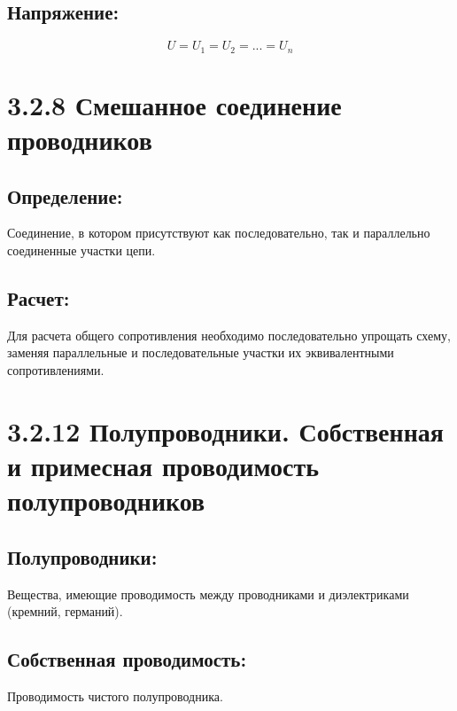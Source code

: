 \documentclass[a4paper,12pt]{article}
\begin{document}
\vspace{-9pt}
\subsection*{Напряжение:}
\vspace{-3pt}
\vspace{-0.05em}
$$ U = U_1 = U_2 = ... = U_n $$

\section*{3.2.8 Смешанное соединение проводников}
\vspace{-9pt}
\subsection*{Определение:}
\vspace{-3pt}
Соединение, в котором присутствуют как последовательно, так и параллельно соединенные участки цепи.

\vspace{-9pt}
\subsection*{Расчет:}
\vspace{-3pt}
Для расчета общего сопротивления необходимо последовательно упрощать схему, заменяя параллельные и последовательные участки их эквивалентными сопротивлениями.

\newpage
\section*{3.2.12 Полупроводники. Собственная и примесная проводимость полупроводников}
\vspace{-9pt}
\subsection*{Полупроводники:}
\vspace{-3pt}
Вещества, имеющие проводимость между проводниками и диэлектриками (кремний, германий).

\vspace{-9pt}
\subsection*{Собственная проводимость:}
\vspace{-3pt}
Проводимость чистого полупроводника.
\end{document}
